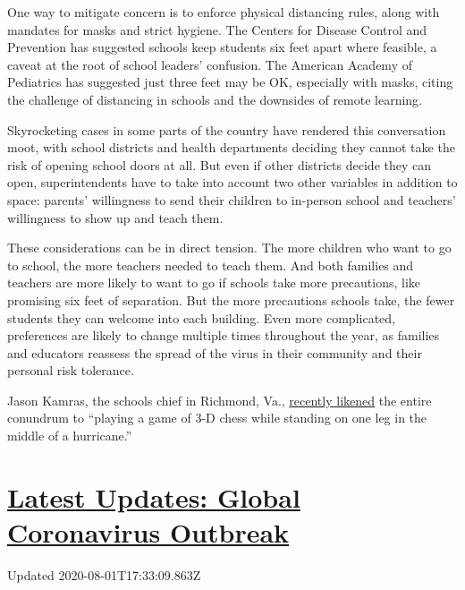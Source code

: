 One way to mitigate concern is to enforce physical distancing rules,
along with mandates for masks and strict hygiene. The Centers for
Disease Control and Prevention has suggested schools keep students six
feet apart where feasible, a caveat at the root of school leaders'
confusion. The American Academy of Pediatrics has suggested just three
feet may be OK, especially with masks, citing the challenge of
distancing in schools and the downsides of remote learning.

Skyrocketing cases in some parts of the country have rendered this
conversation moot, with school districts and health departments deciding
they cannot take the risk of opening school doors at all. But even if
other districts decide they can open, superintendents have to take into
account two other variables in addition to space: parents' willingness
to send their children to in-person school and teachers' willingness to
show up and teach them.

These considerations can be in direct tension. The more children who
want to go to school, the more teachers needed to teach them. And both
families and teachers are more likely to want to go if schools take more
precautions, like promising six feet of separation. But the more
precautions schools take, the fewer students they can welcome into each
building. Even more complicated, preferences are likely to change
multiple times throughout the year, as families and educators reassess
the spread of the virus in their community and their personal risk
tolerance.

Jason Kamras, the schools chief in Richmond, Va.,
\href{https://twitter.com/jasonkamras/status/1280870903610556417}{recently
likened} the entire conundrum to ``playing a game of 3-D chess while
standing on one leg in the middle of a hurricane.''

\hypertarget{latest-updates-global-coronavirus-outbreak}{%
\section{\texorpdfstring{\href{https://www.nytimes.com/2020/08/01/world/coronavirus-covid-19.html?action=click\&pgtype=Article\&state=default\&region=MAIN_CONTENT_1\&context=storylines_live_updates}{Latest
Updates: Global Coronavirus
Outbreak}}{Latest Updates: Global Coronavirus Outbreak}}\label{latest-updates-global-coronavirus-outbreak}}

Updated 2020-08-01T17:33:09.863Z

